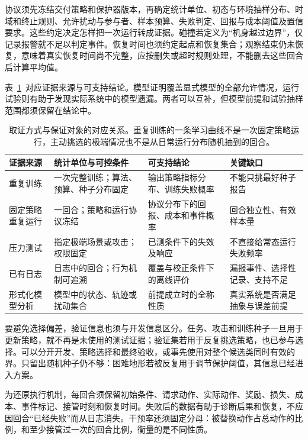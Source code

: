 协议须先冻结交付策略和保护器版本，再确定统计单位、初态与环境抽样分布、时域和终止规则、允许扰动与参与者、样本预算、失败判定、回报与成本阈值及置信要求。这些约定决定怎样把一次运行转成证据。碰撞若定义为“机身越过边界”，仅记录报警就不足以判定事件。恢复时间也须约定起点和恢复集合；观察结束仍未恢复，意味着真实恢复时间尚不完整，应按删失或超时规则处理，不能删去这些回合后计算平均值。

表~\ref{tab:rl-trustworthy-evidence-sources}~对应证据来源与可支持结论。模型证明覆盖显式模型的全部允许情况，运行试验则有助于发现实际系统中的模型遗漏。两者可以互补，但模型前提和试验抽样范围都须保留在结论中。

\begin{table}[t]
  \centering
  \begin{tabularx}{\linewidth}{@{}>{\raggedright\arraybackslash}p{23mm}XXX@{}}
    \toprule
    证据来源 & 统计单位与可控条件 & 可支持结论 & 关键缺口 \\
    \midrule
    重复训练 & 一次完整训练；算法、预算、种子分布固定 & 输出策略指标分布、训练失败概率 & 不能只挑最好种子报告 \\
    固定策略重复运行 & 一回合；策略和运行协议冻结 & 协议分布下的回报、成本和事件概率 & 回合独立性、有效样本量 \\
    压力测试 & 指定极端场景或攻击；权限固定 & 已测条件下的失效及响应 & 不直接给常态运行失败频率 \\
    已有日志 & 日志中的回合；行为机制可追溯 & 覆盖与校正条件下的离线评价 & 漏报事件、选择性记录、支持不足 \\
    形式化模型分析 & 模型中的状态、轨迹或扰动集合 & 前提成立时的全称性质 & 真实系统是否满足抽象与误差前提 \\
    \bottomrule
  \end{tabularx}
  \caption{取证方式与保证对象的对应关系。重复训练的一条学习曲线不是一次固定策略运行，主动挑选的极端情况也不是从日常运行分布随机抽到的回合。}
  \label{tab:rl-trustworthy-evidence-sources}
\end{table}

要避免选择偏差，验证信息也须与开发信息区分。任务、攻击和训练种子一旦用于更新策略，就不再是未使用的测试证据；验证集若用于反复挑选策略，也已参与选择。可以分开开发、策略选择和最终验收，或事先使用对整个候选类同时有效的界。只留出随机种子仍不够：困难地形若被反复用于调节保护阈值，其信息已经进入方案。

为还原执行机制，每回合须保留初始条件、请求动作、实际动作、奖励、损失、成本、事件标记、接管时刻和恢复时间。失败后的数据有助于诊断后果和恢复，不应因回合“已经失败”而从日志消失。干预率还须固定分母：被替换动作占总动作的比例，和至少接管过一次的回合比例，衡量的是不同性质。

